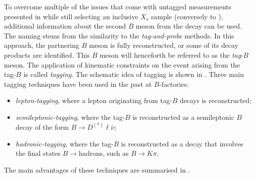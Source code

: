 To overcome multiple of the issues that come with untagged measurements presented in  
while still selecting an inclusive $X_s$ sample (conversely to ), 
additional information about the second $B$ meson from the \FourS decay can be used.
The naming stems from the similarity to the \textit{tag-and-probe} methods.
In this approach, the partnering $B$ meson is fully reconstructed, or some of its decay products are identified.
This $B$ meson will henceforth be referred to as the \textit{tag}-$B$ meson.
The application of kinematic constraints on the event arising from the tag-$B$ is called \textit{tagging}.
The schematic idea of tagging is shown in .
Three main tagging techniques have been used in the past at $B$-factories:
\begin{itemize}
    \item \textit{lepton-tagging}, where a lepton originating from tag-$B$ decays is reconstructed;
    \item \textit{semileptonic-tagging}, where the tag-$B$ is reconstructed as a semileptonic $B$ decay of the form $B\to D^{(*)}\ell\bar{\nu}$;
    \item \textit{hadronic-tagging}, where the tag-$B$ is reconstructed as a decay that involves the final states $B\to\mathrm{hadrons}$, such as $B\to K\pi$.
\end{itemize}
The main advantages of these techniques are summarised in .

